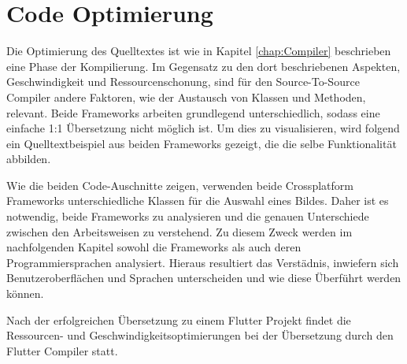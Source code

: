 \section{Code Optimierung}
Die Optimierung des Quelltextes ist wie in Kapitel \ref{chap:Compiler}  beschrieben eine Phase der Kompilierung.  Im Gegensatz zu den dort beschriebenen Aspekten, Geschwindigkeit und Ressourcenschonung,  sind für den Source-To-Source Compiler andere Faktoren, wie der Austausch von Klassen und Methoden,  relevant.  Beide Frameworks arbeiten grundlegend unterschiedlich,  sodass eine einfache 1:1 Übersetzung nicht möglich ist.  Um dies zu visualisieren, wird folgend ein Quelltextbeispiel aus beiden Frameworks gezeigt,  die die selbe Funktionalität abbilden.


\begin{minipage}{\linewidth}

\end{minipage}


\begin{minipage}{\linewidth}

\end{minipage}

Wie die beiden Code-Auschnitte zeigen, verwenden beide Crossplatform Frameworks unterschiedliche Klassen für die Auswahl eines Bildes. Daher ist es notwendig,  beide Frameworks zu analysieren und die genauen Unterschiede zwischen den Arbeitsweisen zu verstehend.  Zu diesem Zweck werden im nachfolgenden Kapitel sowohl die Frameworks als auch deren Programmiersprachen analysiert.  Hieraus resultiert das Verstädnis, inwiefern sich Benutzeroberflächen und Sprachen unterscheiden und wie diese Überführt werden können.

Nach der erfolgreichen Übersetzung zu einem Flutter Projekt findet die Ressourcen- und Geschwindigkeitsoptimierungen bei der Übersetzung durch den Flutter Compiler statt. 


